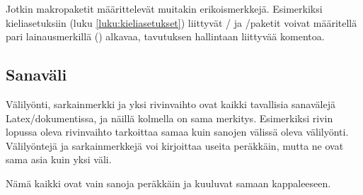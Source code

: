 
Jotkin makropaketit määrittelevät muitakin erikoismerkkejä. Esimerkiksi
kieli\-asetuksiin (luku \ref{luku:kieliasetukset}) liittyvät
\-/{} ja \-/paketit voivat
määritellä pari lainausmerkillä (\koodi{\textquotedbl}) alkavaa,
tavutuksen hallintaan liittyvää komentoa.

\subsection{Sanaväli}
\label{luku:sanavali}

Välilyönti, sarkainmerkki ja yksi rivinvaihto ovat kaikki tavallisia
sanavälejä Latex\-/dokumentissa, ja näillä kolmella on sama merkitys.
Esimerkiksi rivin lopussa oleva rivinvaihto tarkoittaa samaa kuin
sanojen välissä oleva välilyönti. Välilyöntejä ja sarkainmerkkejä voi
kirjoittaa useita peräkkäin, mutta ne ovat sama asia kuin yksi väli.

\begin{koodilohkosis}
  Nämä      kaikki
       ovat            vain
  sanoja  peräkkäin  ja               kuuluvat
      samaan kappaleeseen.
\end{koodilohkosis}

